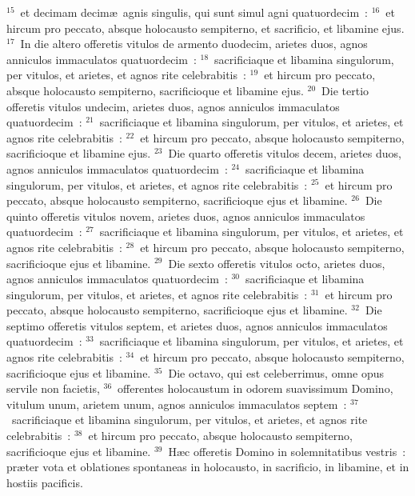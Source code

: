 ${}^{15}$~et decimam decim\ae\ agnis singulis, qui sunt simul agni quatuordecim~:
${}^{16}$~et hircum pro peccato, absque holocausto sempiterno, et sacrificio, et libamine ejus.
${}^{17}$~In die altero offeretis vitulos de armento duodecim, arietes duos, agnos anniculos immaculatos quatuordecim~:
${}^{18}$~sacrificiaque et libamina singulorum, per vitulos, et arietes, et agnos rite celebrabitis~:
${}^{19}$~et hircum pro peccato, absque holocausto sempiterno, sacrificioque et libamine ejus.
${}^{20}$~Die tertio offeretis vitulos undecim, arietes duos, agnos anniculos immaculatos quatuordecim~:
${}^{21}$~sacrificiaque et libamina singulorum, per vitulos, et arietes, et agnos rite celebrabitis~:
${}^{22}$~et hircum pro peccato, absque holocausto sempiterno, sacrificioque et libamine ejus.
${}^{23}$~Die quarto offeretis vitulos decem, arietes duos, agnos anniculos immaculatos quatuordecim~:
${}^{24}$~sacrificiaque et libamina singulorum, per vitulos, et arietes, et agnos rite celebrabitis~:
${}^{25}$~et hircum pro peccato, absque holocausto sempiterno, sacrificioque ejus et libamine.
${}^{26}$~Die quinto offeretis vitulos novem, arietes duos, agnos anniculos immaculatos quatuordecim~:
${}^{27}$~sacrificiaque et libamina singulorum, per vitulos, et arietes, et agnos rite celebrabitis~:
${}^{28}$~et hircum pro peccato, absque holocausto sempiterno, sacrificioque ejus et libamine.
${}^{29}$~Die sexto offeretis vitulos octo, arietes duos, agnos anniculos immaculatos quatuordecim~:
${}^{30}$~sacrificiaque et libamina singulorum, per vitulos, et arietes, et agnos rite celebrabitis~:
${}^{31}$~et hircum pro peccato, absque holocausto sempiterno, sacrificioque ejus et libamine.
${}^{32}$~Die septimo offeretis vitulos septem, et arietes duos, agnos anniculos immaculatos quatuordecim~:
${}^{33}$~sacrificiaque et libamina singulorum, per vitulos, et arietes, et agnos rite celebrabitis~:
${}^{34}$~et hircum pro peccato, absque holocausto sempiterno, sacrificioque ejus et libamine.
${}^{35}$~Die octavo, qui est celeberrimus, omne opus servile non facietis,
${}^{36}$~offerentes holocaustum in odorem suavissimum Domino, vitulum unum, arietem unum, agnos anniculos immaculatos septem~:
${}^{37}$~sacrificiaque et libamina singulorum, per vitulos, et arietes, et agnos rite celebrabitis~:
${}^{38}$~et hircum pro peccato, absque holocausto sempiterno, sacrificioque ejus et libamine.
${}^{39}$~H\ae c offeretis Domino in solemnitatibus vestris~: pr\ae ter vota et oblationes spontaneas in holocausto, in sacrificio, in libamine, et in hostiis pacificis.

